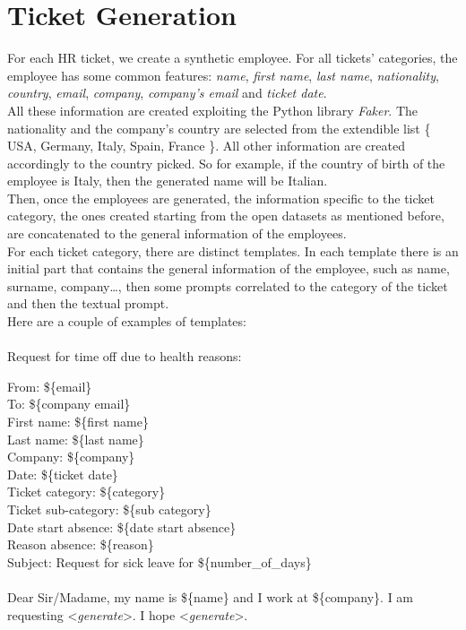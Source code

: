 \section{Ticket Generation}
For each HR ticket, we create a synthetic employee. For all tickets' categories, the employee has some common features: \textit{name}, \textit{first name}, \textit{last name}, \textit{nationality}, \textit{country}, \textit{email}, \textit{company}, \textit{company's email} and \textit{ticket date}.\\
All these information are created exploiting the Python library \textit{Faker}\cite{Faraglia_Faker}. The nationality and the company's country are selected from the extendible list \{ USA, Germany, Italy, Spain, France \}. All other information are created accordingly to the country picked. So for example, if the country of birth of the employee is Italy, then the generated name will be Italian. \\
Then, once the employees are generated, the information specific to the ticket category, the ones created starting from the open datasets as mentioned before, are concatenated to the general information of the employees. \\
For each ticket category, there are distinct templates. In each template there is an initial part that contains the general information of the employee, such as name, surname, company\dots, then some prompts correlated to the category of the ticket and then the textual prompt. \\
Here are a couple of examples of templates:\\ \\
Request for time off due to health reasons:
\begin{adjustwidth}{1cm}{}
From: \$\{email\} \\
To: \$\{company email\} \\
First name: \$\{first name\}\\
Last name: \$\{last name\}\\
Company: \$\{company\}\\
Date: \$\{ticket date\}\\
Ticket category: \$\{category\}\\
Ticket sub-category: \$\{sub category\} \\
Date start absence: \$\{date start absence\} \\
Reason absence: \$\{reason\} \\ 
Subject: Request for sick leave for \$\{number\_of\_days\} \\ 
\\
Dear Sir/Madame, my name is \$\{name\} and I work at \$\{company\}. I am requesting \textless \textit{generate}\textgreater. I hope \textless \textit{generate}\textgreater. \\ \\

\end{adjustwidth}
